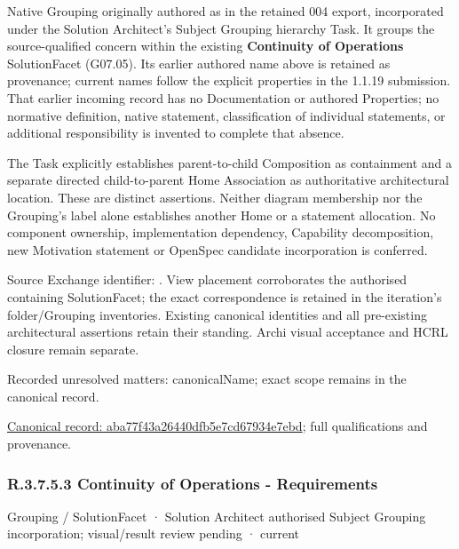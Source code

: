 Native Grouping originally authored as \texttt{} in the retained 004 export,
incorporated under the Solution Architect's Subject Grouping hierarchy Task.
It groups the source-qualified \texttt{} concern within
the existing \textbf{Continuity of Operations} SolutionFacet (G07.05). Its earlier authored name above is retained as provenance; current names
follow the explicit properties in the 1.1.19 submission.
That earlier incoming record has no Documentation or authored Properties; no normative
definition, native statement, classification of individual statements, or
additional responsibility is invented to complete that absence.



The Task explicitly establishes parent-to-child Composition as containment and
a separate directed child-to-parent Home Association as authoritative architectural
location. These are distinct assertions. Neither diagram membership nor the
Grouping's label alone establishes another Home or a statement allocation.
No component ownership, implementation dependency, Capability decomposition,
new Motivation statement or OpenSpec candidate incorporation is conferred.



Source Exchange identifier: \texttt{}. View placement corroborates
the authorised containing SolutionFacet; the exact correspondence is retained in the
iteration's folder/Grouping inventories. Existing canonical identities and all
pre-existing architectural assertions retain their standing. Archi visual
acceptance and HCRL closure remain separate.


{\small Recorded unresolved matters: canonicalName; exact scope remains in the canonical record.}\par
{\footnotesize \href{../../../../../../../continuum/grouping/aba77f43a26440dfb5e7cd67934e7ebd.md}{Canonical record: aba77f43a26440dfb5e7cd67934e7ebd}; full qualifications and provenance.}\par
\subsubsection*{R.3.7.5.3 Continuity of Operations - Requirements}
\label{navigation:R.3.7.5.3}

\label{element:709d34e55e7b4c7a9e010f5465f76473}
{\small Grouping / SolutionFacet · Solution Architect authorised Subject Grouping incorporation; visual/result review pending · current}\par

